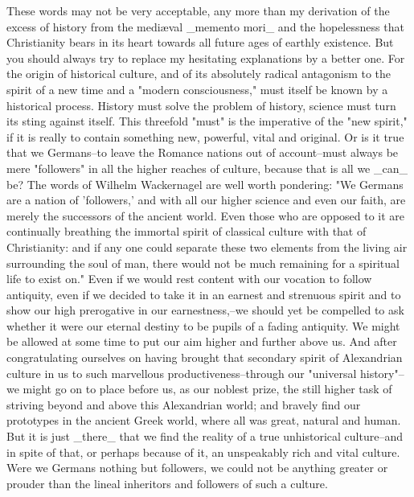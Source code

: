 These words may not be very acceptable, any more than my derivation
of the excess of history from the mediæval _memento mori_ and the
hopelessness that Christianity bears in its heart towards all future
ages of earthly existence. But you should always try to replace my
hesitating explanations by a better one. For the origin of historical
culture, and of its absolutely radical antagonism to the spirit of a
new time and a "modern consciousness," must itself be known by a
historical process. History must solve the problem of history,
science must turn its sting against itself. This threefold "must" is
the imperative of the "new spirit," if it is really to contain
something new, powerful, vital and original. Or is it true that we
Germans--to leave the Romance nations out of account--must always be
mere "followers" in all the higher reaches of culture, because that
is all we _can_ be? The words of Wilhelm Wackernagel are well worth
pondering: "We Germans are a nation of 'followers,' and with all our
higher science and even our faith, are merely the successors of the
ancient world. Even those who are opposed to it are continually
breathing the immortal spirit of classical culture with that of
Christianity: and if any one could separate these two elements from
the living air surrounding the soul of man, there would not be much
remaining for a spiritual life to exist on." Even if we would rest
content with our vocation to follow antiquity, even if we decided to
take it in an earnest and strenuous spirit and to show our high
prerogative in our earnestness,--we should yet be compelled to ask
whether it were our eternal destiny to be pupils of a fading
antiquity. We might be allowed at some time to put our aim higher and
further above us. And after congratulating ourselves on having
brought that secondary spirit of Alexandrian culture in us to such
marvellous productiveness--through our "universal history"--we might
go on to place before us, as our noblest prize, the still higher task
of striving beyond and above this Alexandrian world; and bravely find
our prototypes in the ancient Greek world, where all was great,
natural and human. But it is just _there_ that we find the reality of
a true unhistorical culture--and in spite of that, or perhaps because
of it, an unspeakably rich and vital culture. Were we Germans nothing
but followers, we could not be anything greater or prouder than the
lineal inheritors and followers of such a culture.

